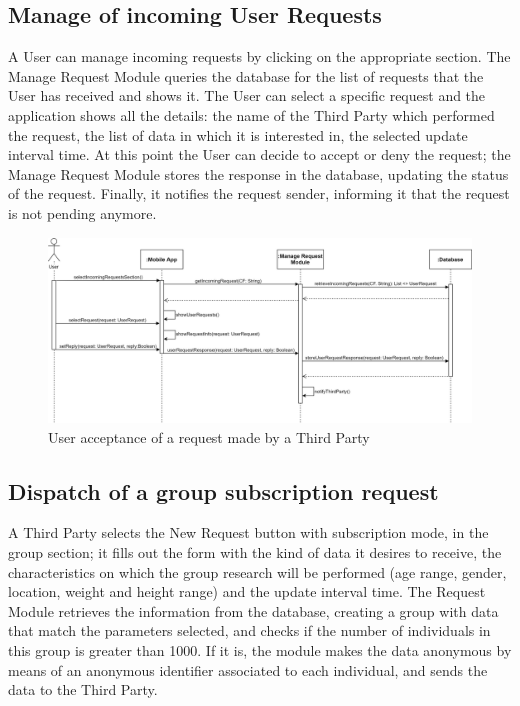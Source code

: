 \subsection{Manage of incoming User Requests}
A User can manage incoming requests by clicking on the appropriate section. The Manage Request Module queries the database for the list of requests that the User has received and shows it. The User can select a specific request and the application shows all the details:
the name of the Third Party which performed the request, the list of data in which it is interested in, the selected update interval time. At this point the User can decide to accept or deny the request; the Manage Request Module stores the response in the database, updating the status of the request. Finally, it notifies the request sender, informing it that the request is not pending anymore. 

\begin{figure}[H]

    \centering
    \includegraphics[scale=0.14]{./Pictures/acceptRequest.png}
    \caption{User acceptance of a request made by a Third Party}
    
\end{figure}

\subsection{Dispatch of a group subscription request}
A Third Party selects the New Request button with subscription mode, in the group section; it fills out the form with the kind of data it desires to receive, the characteristics on which the group research will be performed (age range, gender, location, weight and height range) and the update interval time. The Request Module retrieves the information from the database, creating a group with data that match the parameters selected, and checks if the number of individuals in this group is greater than 1000. If it is, the module makes the data anonymous by means of an anonymous identifier associated to each individual, and sends the data to the Third Party.

